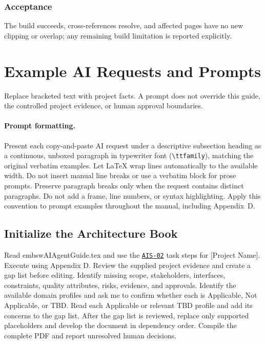 \subsubsection*{Acceptance}
\label{Section:AIBuildAcceptance}
The build succeeds, cross-references resolve, and affected pages have no new clipping or overlap; any remaining build limitation is reported explicitly.

\section{Example AI Requests and Prompts}
\label{Section:AIExamplePrompts}
Replace bracketed text with project facts. A prompt does not override this
guide, the controlled project evidence, or human approval boundaries.

\paragraph{Prompt formatting.}\label{Section:AIPromptFormatting}
Present each copy-and-paste AI request under a descriptive subsection heading
as a continuous, unboxed paragraph in typewriter font (\texttt{\textbackslash ttfamily}), matching the original
verbatim examples.
Let LaTeX wrap lines automatically to the available width. Do not insert manual
line breaks or use a verbatim block for prose prompts. Preserve paragraph
breaks only when the request contains distinct paragraphs. Do not add a frame,
line numbers, or syntax highlighting. Apply this convention
to prompt examples throughout the manual, including Appendix~D.

\subsection{Initialize the Architecture Book}
\label{Section:AIInitializePrompt}
\begingroup\ttfamily\raggedright
\noindent Read embswAIAgentGuide.tex and use the \hyperref[Skill:AIS-02]{\texttt{AIS-02}} task steps for [Project Name]. Execute using Appendix D. Review the supplied project evidence and create a gap list before editing. Identify missing scope, stakeholders, interfaces, constraints, quality attributes, risks, evidence, and approvals. Identify the available domain profiles and ask me to confirm whether each is Applicable, Not Applicable, or TBD. Read each Applicable or relevant TBD profile and add its concerns to the gap list. After the gap list is reviewed, replace only supported placeholders and develop the document in dependency order. Compile the complete PDF and report unresolved human decisions.\par
\endgroup


